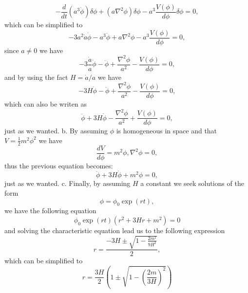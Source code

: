\documentclass[11pt]{article}
\begin{document}
\begin{problem}
\begin{displaymath}
  -\frac{d}{dt}\left(a^3\dot\phi\right)\delta\phi + (a\nabla^2\phi)\delta\phi - a^3 \frac{V(\phi)}{d\phi}\delta\phi = 0,
\end{displaymath}
which can be simplified to 
\begin{displaymath}
  -3a^2\dot a\dot\phi  - a^3\ddot\phi + a\nabla^2\phi - a^3 \frac{V(\phi)}{d\phi}=0,
\end{displaymath}
since $a\neq 0$ we have
\begin{displaymath}
 -3\frac{\dot a}{a}\dot\phi  - \ddot\phi + \frac{\nabla^2\phi}{a^2} -\frac{V(\phi)}{d\phi}=0,
\end{displaymath}
and by using the fact $H = \dot a /a$ we have
\begin{displaymath}
-3H\dot\phi  - \ddot\phi + \frac{\nabla^2\phi}{a^2} -\frac{V(\phi)}{d\phi}=0, 
\end{displaymath}
which can also be writen as
\begin{displaymath}
\ddot\phi + 3H\dot\phi- \frac{\nabla^2\phi}{a^2} + \frac{V(\phi)}{d\phi}=0,
\end{displaymath}
just as we wanted.
\newline
b. By assuming $\phi$ is homogeneous in space and that $V=\frac{1}{2}m^2\phi^2$ we have
\begin{displaymath}
  \frac{dV}{d\phi} = m^2\phi, \nabla^2\phi = 0,
\end{displaymath}
thus the previous equation becomes:
\begin{displaymath}
\ddot\phi + 3H\dot\phi + m^2\phi=0,  
\end{displaymath}
just as we wanted.
\newline
c. Finally, by assuming $H$ a constant we seek solutions of the form 
\begin{displaymath}
  \phi = \phi_0\exp(rt),
\end{displaymath}
we have the following equation
\begin{displaymath}
\phi_0\exp(rt)\left(r^2 +3Hr+m^2\right)=0
\end{displaymath}
and solving the characteristic equation lead us to the following expression
\begin{displaymath}
  r = \frac{-3H\pm \sqrt{1-\frac{2m^2}{9H^2}}}{2},
\end{displaymath}
which can be simplified to 
\begin{displaymath}
r = \frac{3H}{2}\left( 1 \pm \sqrt{1-\left(\frac{2m}{3H}\right )^2}\right)
\end{displaymath}

\end{problem}
\end{document}
